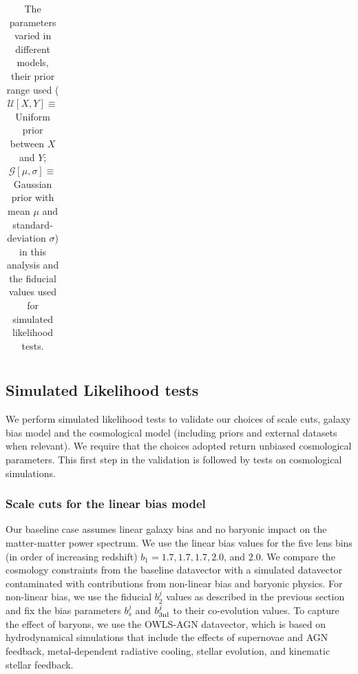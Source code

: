 \documentclass[fleqn,usenatbib]{mnras}
\newcommand{\IR}[1]{{\color{red}[\textbf{Note for IR}: #1]}}
\begin{document}
\begin{table}[H]
\begin{tabular}{|c| c c c|}
\hline
\end{tabular}
\caption{The parameters varied in different models, their prior range used ($\mathcal{U}[X, Y] \equiv$ Uniform prior between $X$ and $Y$; $\mathcal{G}[\mu, \sigma] \equiv$ Gaussian prior with mean $\mu$ and standard-deviation $\sigma$) in this analysis and the fiducial values used for simulated likelihood tests.}
\end{table}



\subsection{Simulated Likelihood tests}\label{sec:simlike_analysis}


We perform simulated likelihood tests to validate our choices of scale cuts, galaxy bias model and the cosmological model (including priors and external datasets when relevant). We require that the choices adopted return unbiased cosmological parameters. This first step in the validation is followed by tests on cosmological simulations. 

\subsubsection{Scale cuts for the linear bias model}
\label{sec:sc_linbias}



Our baseline case assumes linear galaxy bias and no baryonic impact on the matter-matter power spectrum. We use the linear bias values for the five lens bins (in order of increasing redshift) $b_1 = 1.7, 1.7, 1.7, 2.0$, and  $2.0$. We compare the cosmology constraints from the baseline datavector with a simulated datavector contaminated with contributions from non-linear bias and baryonic physics. For non-linear bias, we use the fiducial $b^j_2$ values as described in the previous section and fix the bias parameters $b^j_s$ and $b^j_{\rm 3nl}$ to their co-evolution values. To capture the effect of baryons, we use the OWLS-AGN datavector, which is based on hydrodynamical simulations that include the effects of supernovae and AGN feedback, metal-dependent radiative cooling, stellar evolution, and kinematic stellar feedback. 
\end{document}
